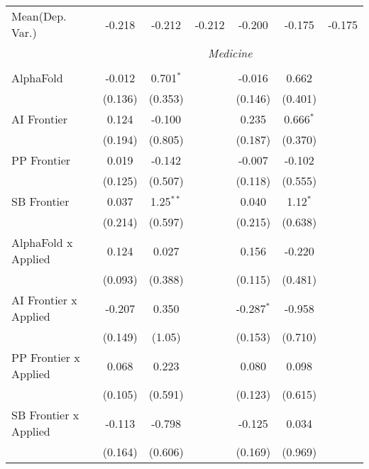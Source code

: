 \begin{tabular}{lcccccc}
Mean(Dep. Var.) & -0.218 & -0.212 & -0.212 & -0.200 & -0.175 & -0.175 \\
 & \multicolumn{6}{c}{\textit{Medicine}} \\ \\
   AlphaFold                      & -0.012  & 0.701$^{*}$ &               & -0.016       & 0.662       &   \\   
                                  & (0.136) & (0.353)     &               & (0.146)      & (0.401)     &   \\   
   AI Frontier                    & 0.124   & -0.100      &               & 0.235        & 0.666$^{*}$ &   \\   
                                  & (0.194) & (0.805)     &               & (0.187)      & (0.370)     &   \\   
   PP Frontier                    & 0.019   & -0.142      &               & -0.007       & -0.102      &   \\   
                                  & (0.125) & (0.507)     &               & (0.118)      & (0.555)     &   \\   
   SB Frontier                    & 0.037   & 1.25$^{**}$ &               & 0.040        & 1.12$^{*}$  &   \\   
                                  & (0.214) & (0.597)     &               & (0.215)      & (0.638)     &   \\   
   AlphaFold x Applied            & 0.124   & 0.027       &               & 0.156        & -0.220      &   \\   
                                  & (0.093) & (0.388)     &               & (0.115)      & (0.481)     &   \\   
   AI Frontier x Applied          & -0.207  & 0.350       &               & -0.287$^{*}$ & -0.958      &   \\   
                                  & (0.149) & (1.05)      &               & (0.153)      & (0.710)     &   \\   
   PP Frontier x Applied          & 0.068   & 0.223       &               & 0.080        & 0.098       &   \\   
                                  & (0.105) & (0.591)     &               & (0.123)      & (0.615)     &   \\   
   SB Frontier x Applied          & -0.113  & -0.798      &               & -0.125       & 0.034       &   \\   
                                  & (0.164) & (0.606)     &               & (0.169)      & (0.969)     &   \\   

\end{tabular}
